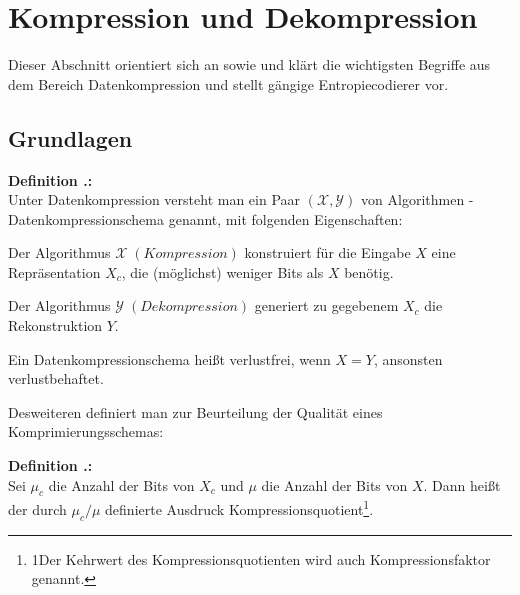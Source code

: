 \documentclass[a4paper,12pt]{article}
\newcommand{\X}{\mathcal X}
\newcommand{\Y}{\mathcal Y}
\newcounter{Definition}
\newcounter{Algorithmus}
\newenvironment{Definition}{
\bigskip
        
        \setlength{\parindent}{0pt}
        \addtocounter{Definition}{1}
        \textbf{\textsf{Definition \thesubsection.\theDefinition}:}\\}{
        \nopagebreak
        \vspace{-1.0ex}
        \bigskip
        
}
\begin{document}
\section{Kompression und Dekompression}
Dieser Abschnitt orientiert sich an\cite{henne} sowie \cite{Lajmi} und klärt die wichtigsten Begriffe aus dem Bereich Datenkompression und stellt gängige Entropiecodierer vor.
\subsection{Grundlagen}
\begin{Definition}
Unter Datenkompression versteht man ein Paar $(\X,\Y)$ von Algorithmen - Datenkompressionschema genannt, mit folgenden Eigenschaften:

Der Algorithmus $\X \; \left(Kompression\right)$ konstruiert für die Eingabe $X$ eine Repräsentation $X_c$, die (möglichst) weniger Bits als $X$ benötig.
\par
Der Algorithmus  $\Y \; \left(Dekompression\right)$ generiert zu gegebenem $X_c$ die Rekonstruktion $Y$.
\par
 Ein Datenkompressionschema heißt verlustfrei, wenn $X = Y$, ansonsten verlustbehaftet.
\end{Definition}
Desweiteren definiert man zur Beurteilung der Qualität eines Komprimierungsschemas:
\begin{Definition}
Sei $\mu_c$ die Anzahl der Bits von $X_c$ und $\mu$ die Anzahl der Bits von $X$. Dann heißt der durch
$
\mu_c \slash \mu
$
definierte Ausdruck Kompressionsquotient\footnote{\footnotesize{1Der Kehrwert des Kompressionsquotienten wird auch Kompressionsfaktor genannt.}}.
\end{Definition}
\end{document}

